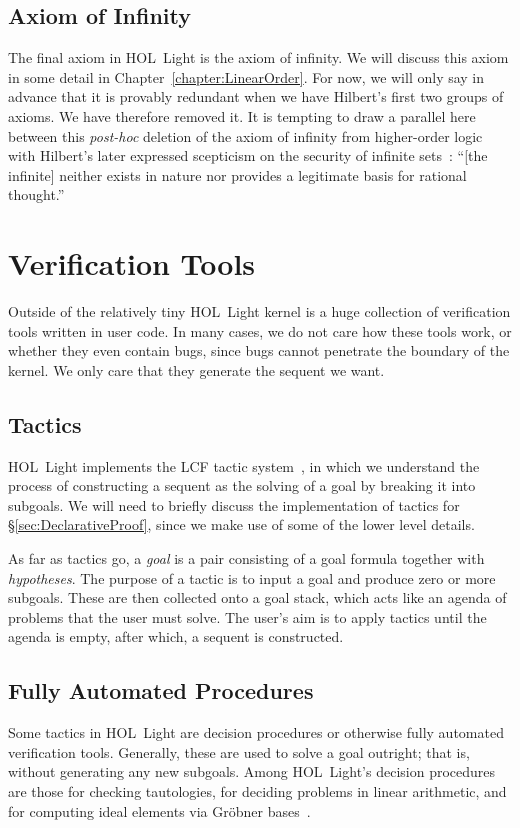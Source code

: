 \subsection{Axiom of Infinity}\label{sec:InfinityDescription}
The final axiom in HOL~Light is the axiom of infinity. We will discuss this axiom in some detail in Chapter~\ref{chapter:LinearOrder}. For now, we will only say in advance that it is provably redundant when we have Hilbert's first two groups of axioms. We have therefore removed it. It is tempting to draw a parallel here between this \emph{post-hoc} deletion of the axiom of infinity from higher-order logic with Hilbert's later expressed scepticism on the security of infinite sets~\cite{OnInfinite}: ``[the infinite] neither exists in nature nor provides a legitimate basis for rational thought.''

\section{Verification Tools}\label{sec:UserTools}
Outside of the relatively tiny HOL~Light kernel is a huge collection of verification tools written in user code. In many cases, we do not care how these tools work, or whether they even contain bugs, since bugs cannot penetrate the boundary of the kernel. We only care that they generate the sequent we want.

\subsection{Tactics}
HOL~Light implements the LCF tactic system~\cite{Tactics}, in which we understand the process of constructing a sequent as the solving of a goal by breaking it into subgoals. We will need to briefly discuss the implementation of tactics for \S\ref{sec:DeclarativeProof}, since we make use of some of the lower level details.

As far as tactics go, a \emph{goal} is a pair consisting of a goal formula together with \emph{hypotheses}. The purpose of a tactic is to input a goal and produce zero or more subgoals. These are then collected onto a goal stack, which acts like an agenda of problems that the user must solve. The user's aim is to apply tactics until the agenda is empty, after which, a sequent is constructed.

\subsection{Fully Automated Procedures}
Some tactics in HOL~Light are decision procedures or otherwise fully automated verification tools. Generally, these are used to solve a goal outright; that is, without generating any new subgoals. Among HOL~Light's decision procedures are those for checking tautologies, for deciding problems in linear arithmetic, and for computing ideal elements via Gr\"{o}bner bases~\cite{BuchbergerGrobner}.

